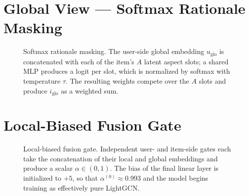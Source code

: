 \section{Global View — Softmax Rationale Masking}
\label{sec:softmax}


\begin{figure}[ht]
  \centering
  \caption{Softmax rationale masking. The user-side global embedding $u_{\mathrm{glo}}$ is concatenated with each of the item's $A$ latent aspect slots; a shared MLP produces a logit per slot, which is normalized by softmax with temperature $\tau$. The resulting weights compete over the $A$ slots and produce $i_{\mathrm{glo}}$ as a weighted sum.}
  \label{fig:softmax}
\end{figure}

\section{Local-Biased Fusion Gate}
\label{sec:gate}


\begin{figure}[ht]
  \centering
  \caption{Local-biased fusion gate. Independent user- and item-side gates each take the concatenation of their local and global embeddings and produce a scalar $\alpha \in (0, 1)$. The bias of the final linear layer is initialized to $+5$, so that $\alpha^{(0)} \approx 0.993$ and the model begins training as effectively pure LightGCN.}
  \label{fig:gate}
\end{figure}

